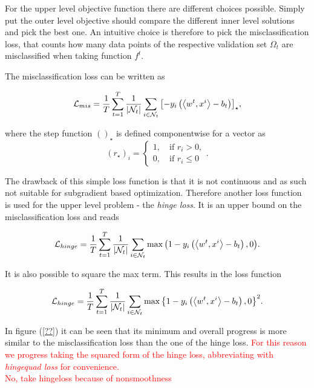 For the upper level objective function there are different choices possible.
Simply put the outer level objective should compare the different inner level solutions and pick the best one. An intuitive choice is therefore to pick the misclassification loss, that counts how many data points of the respective validation set \(\Omega_t\) are misclassified when taking function \(f^t\).

The misclassification loss can be written as

\begin{equation}
	\mathcal{L}_{mis} = \frac{1}{T}\sum_{t=1}^T\frac{1}{|\mathcal{N}_t|}\sum_{i \in \mathcal{N}_t}{\left[-y_i\left(\left\langle w^t,x^i\right\rangle-b_t\right)\right]_{\star}},
\label{misclass_loss}
\end{equation}

where the step function \(()_{\star}\) is defined componentwise for a vector as
\begin{equation}
	(r_{\star})_i = \left\{\begin{array}{c} 1, \quad \text{if } r_i > 0, \\ 0, \quad \text{if } r_i \leq 0 \end{array} \right. .
\label{step_fun}
\end{equation}

The drawback of this simple loss function is that it is not continuous and as such not suitable for subgradient based optimization. Therefore another loss function is used for the upper level problem - the \emph{hinge loss}. It is an upper bound on the misclassification loss and reads

\begin{equation}
		\mathcal{L}_{hinge} = \frac{1}{T}\sum_{t=1}^T\frac{1}{|\mathcal{N}_t|}\sum_{i \in \mathcal{N}_t}{\max\left(1-y_i\left(\left\langle w^t,x^i\right\rangle-b_t\right),0\right)}.
\label{hinge_loss}
\end{equation}

It is also possible to square the max term. This results in the loss function

\begin{equation}
		\mathcal{L}_{hinge} = \frac{1}{T}\sum_{t=1}^T\frac{1}{|\mathcal{N}_t|}\sum_{i \in \mathcal{N}_t}{\max\left\{1-y_i\left(\left\langle w^t,x^i\right\rangle-b_t\right),0\right\}^2}.
\label{hingequad_loss}
\end{equation}

In figure (\ref{??}) it can be seen that its minimum and overall progress is more similar to the misclassification loss than the one of the hinge loss. 
\textcolor{red}{For this reason we progress taking the squared form of the hinge loss, abbreviating with \emph{hingequad loss} for convenience.\\
No, take hingeloss because of nonsmoothness}

